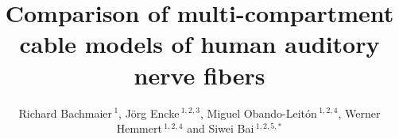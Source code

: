\documentclass[utf8]{frontiersSCNS} %
\def\firstAuthorLast{Richard Bachmaier {et~al.}} %
\def\Authors{Richard Bachmaier\,$^{1}$, Jörg Encke\,$^{1,2,3}$, Miguel Obando-Leitón\,$^{1,2,4}$, Werner Hemmert\,$^{1,2,4}$ and Siwei Bai\,$^{1,2,5,*}$}
\begin{document}
\onecolumn
{}

\title[Human ANF cable model comparison]{Comparison of multi-compartment cable models of human auditory nerve fibers}

\author[\firstAuthorLast ]{\Authors} %
\address{} %
\correspondance{} %

\extraAuth{}%

\maketitle
\end{document}
